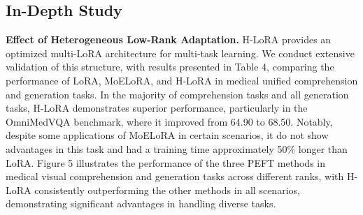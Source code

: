 

\subsection{In-Depth Study}

\noindent \textbf{Effect of Heterogeneous Low-Rank Adaptation.}
H-LoRA provides an optimized multi-LoRA architecture for multi-task learning. We conduct extensive validation of this structure, with results presented in Table 4, comparing the performance of LoRA, MoELoRA, and H-LoRA in medical unified comprehension and generation tasks. In the majority of comprehension tasks and all generation tasks, H-LoRA demonstrates superior performance, particularly in the OmniMedVQA benchmark, where it improved from 64.90 to 68.50. Notably, despite some applications of MoELoRA in certain scenarios, it do not show advantages in this task and had a training time approximately 50\% longer than LoRA. 
Figure 5 illustrates the performance of the three PEFT methods in medical visual comprehension and generation tasks across different ranks, with H-LoRA consistently outperforming the other methods in all scenarios, demonstrating significant advantages in handling diverse tasks.

